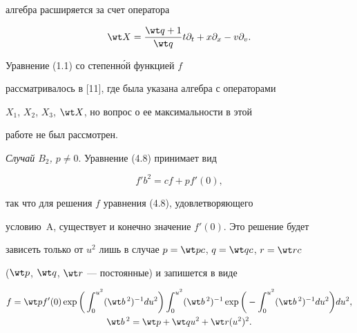 алгебра расширяется за счет оператора 


$$ 


\wt X=\frac{\wt q+1}{\wt q}t\partial_t+x\partial_x- 


v\partial_v. 


$$ 


 


 


\begin{notenonum} 


Уравнение (1.1) со степенн\'ой функцией $f$ 


рассматривалось в [11], где была указана алгебра с операторами 


$X_1$, $X_2$, $X_3$, $\wt X$, но вопрос о ее максимальности в этой 


работе не был рассмотрен. 


\end{notenonum} 


 


 


{\it Случай $B_2$, $p\ne0$}. Уравнение (4.8) принимает вид 


\begin{equation} 


f' b^2=cf+pf'(0), 


\end{equation} 


так что для решения $f$ уравнения (4.8), удовлетворяющего 


условию~A, существует и конечно значение $f'(0)$. Это решение будет 


зависеть только от $u^2$ лишь в случае $p=\wt pc$, $q=\wt qc$, $r=\wt rc$\linebreak 


($\wt p$, $\wt q$, $\wt r$ --- постоянные) и запишется в виде 


\begin{gather*} 


f=\wt p f'(0)\exp\bigg(\int^{u^2}_0(\wt b{}\,^2)^{-1}du^2\bigg) 


\int^{u^2}_0(\wt b{}\,^2)^{-1}\exp\bigg(-\int^{u^2}_0 


(\wt b{}\,^2)^{-1}du^2\bigg)du^2,\\ 


% 


\wt b{}\,^2=\wt p+\wt q u^2+\wt r(u^2)^2. 


\end{gather*} 


